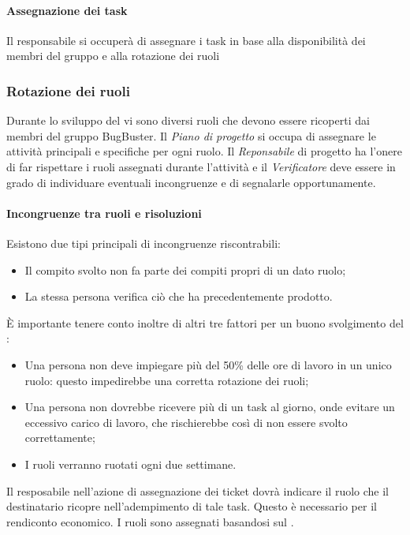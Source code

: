 \paragraph*{Assegnazione dei task}Il responsabile si occuperà di assegnare i task in base alla disponibilità dei membri del gruppo e alla rotazione dei ruoli

\subsubsection{Rotazione dei ruoli}

Durante lo sviluppo del  vi sono diversi ruoli che devono essere ricoperti dai membri del gruppo BugBuster. Il \textit{Piano di progetto} si occupa di assegnare le attività principali e specifiche per ogni ruolo. Il \textit{Reponsabile} di progetto ha l'onere di far rispettare i ruoli assegnati durante l'attività e il \textit{Verificatore} deve essere in grado di individuare eventuali incongruenze e di segnalarle opportunamente.
\paragraph*{Incongruenze tra ruoli e risoluzioni}
Esistono due tipi principali di incongruenze riscontrabili:
\begin{itemize}

\item Il compito svolto non fa parte dei compiti propri di un dato ruolo;
\item La stessa persona verifica ciò che ha precedentemente prodotto.
\end{itemize}

È importante tenere conto inoltre di altri tre fattori per un buono svolgimento del :
\begin{itemize}

\item Una persona non deve impiegare più del 50\% delle ore di lavoro in un unico ruolo: questo impedirebbe una corretta rotazione dei ruoli;
\item Una persona non dovrebbe ricevere più di un task al giorno, onde evitare un eccessivo carico di lavoro, che rischierebbe cos\`i di non essere svolto correttamente;
\item I ruoli verranno ruotati ogni due settimane.

\end{itemize}

Il resposabile nell'azione di assegnazione dei ticket dovr\`a indicare il ruolo che il destinatario ricopre nell'adempimento di tale task. Questo \`e necessario per il rendiconto economico. I ruoli sono assegnati basandosi sul \PianoDiProgetto.

